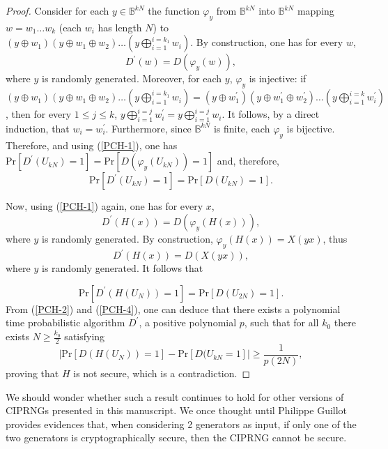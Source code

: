 \begin{proof}
Consider  for each $y\in \mathbb{B}^{kN}$ the function $\varphi_{y}$
from $\mathbb{B}^{kN}$ into $\mathbb{B}^{kN}$ mapping $w=w_1\ldots w_k$
(each $w_i$ has length $N$) to 
$(y\oplus w_1)(y\oplus w_1\oplus w_2)\ldots (y
  \bigoplus_{i=1}^{i=k_1} w_i).$ By construction, one has for every $w$,
\begin{equation}\label{PCH-1}
D^\prime(w)=D(\varphi_y(w)),
\end{equation}
where $y$ is randomly generated. 
Moreover, for each $y$, $\varphi_{y}$ is injective: if 
$(y\oplus w_1)(y\oplus w_1\oplus w_2)\ldots (y\bigoplus_{i=1}^{i=k_1}
w_i)=(y\oplus w_1^\prime)(y\oplus w_1^\prime\oplus w_2^\prime)\ldots
(y\bigoplus_{i=1}^{i=k} w_i^\prime)$, then for every $1\leq j\leq k$,
$y\bigoplus_{i=1}^{i=j} w_i^\prime=y\bigoplus_{i=1}^{i=j} w_i$. It follows,
by a direct induction, that $w_i=w_i^\prime$. Furthermore, since $\mathbb{B}^{kN}$
is finite, each $\varphi_y$ is bijective. Therefore, and using (\ref{PCH-1}),
one has
$\mathrm{Pr}[D^\prime(U_{kN})=1]=\mathrm{Pr}[D(\varphi_y(U_{kN}))=1]$ and,
therefore, 
\begin{equation}\label{PCH-2}
\mathrm{Pr}[D^\prime(U_{kN})=1]=\mathrm{Pr}[D(U_{kN})=1].
\end{equation}

Now, using (\ref{PCH-1}) again, one has  for every $x$,
\begin{equation}\label{PCH-3}
D^\prime(H(x))=D(\varphi_y(H(x))),
\end{equation}
where $y$ is randomly generated. By construction, $\varphi_y(H(x))=X(yx)$,
thus
\begin{equation}%
D^\prime(H(x))=D(X(yx)),
\end{equation}
where $y$ is randomly generated. 
It follows that 

\begin{equation}\label{PCH-4}
\mathrm{Pr}[D^\prime(H(U_{N}))=1]=\mathrm{Pr}[D(U_{2N})=1].
\end{equation}
 From (\ref{PCH-2}) and (\ref{PCH-4}), one can deduce that
there exists a polynomial time probabilistic
algorithm $D^\prime$, a positive polynomial $p$, such that for all $k_0$ there exists
$N\geq \frac{k_0}{2}$ satisfying 
$$| \mathrm{Pr}[D(H(U_{N}))=1]-\mathrm{Pr}[D(U_{kN}=1]|\geq \frac{1}{p(2N)},$$
proving that $H$ is not secure, which is a contradiction. 
\end{proof}

We should wonder whether such a result continues to hold for other versions of
CIPRNGs presented in this manuscript. We once thought until Philippe Guillot 
provides evidences that, when considering 2 generators as input, if only one of
the two generators is cryptographically secure, then the CIPRNG cannot be secure.


